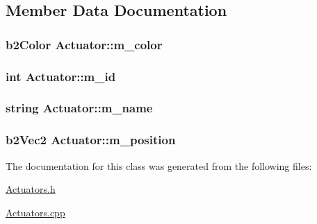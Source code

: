 \subsection{Member Data Documentation}
\hypertarget{classActuator_ad534cbd18d6df7e5ab080b3628f5522d}{
\subsubsection[{m\-\_\-color}]{\setlength{\rightskip}{0pt plus 5cm}b2\-Color Actuator\-::m\-\_\-color}}\label{classActuator_ad534cbd18d6df7e5ab080b3628f5522d}
\hypertarget{classActuator_aec2f761be4e82de74e986f02e5e77527}{
\subsubsection[{m\-\_\-id}]{\setlength{\rightskip}{0pt plus 5cm}int Actuator\-::m\-\_\-id}}\label{classActuator_aec2f761be4e82de74e986f02e5e77527}
\hypertarget{classActuator_a1664ca83d9352531527aa66c2f965b7b}{
\subsubsection[{m\-\_\-name}]{\setlength{\rightskip}{0pt plus 5cm}string Actuator\-::m\-\_\-name}}\label{classActuator_a1664ca83d9352531527aa66c2f965b7b}
\hypertarget{classActuator_ab7e8376ea5e795af2aad96c924253c77}{
\subsubsection[{m\-\_\-position}]{\setlength{\rightskip}{0pt plus 5cm}b2\-Vec2 Actuator\-::m\-\_\-position}}\label{classActuator_ab7e8376ea5e795af2aad96c924253c77}


The documentation for this class was generated from the following files\-:\begin{DoxyCompactItemize}
\item 
\hyperlink{Actuators_8h}{Actuators.\-h}\item 
\hyperlink{Actuators_8cpp}{Actuators.\-cpp}\end{DoxyCompactItemize}
